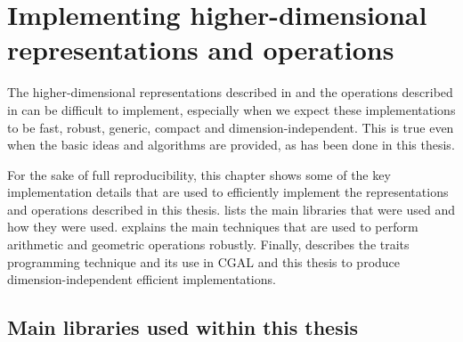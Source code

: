
\chapter{Implementing higher-dimensional representations and operations}
\label{ch:implementation}

The higher-dimensional representations described in  and the operations described in  can be difficult to implement, especially when we expect these implementations to be fast, robust, generic, compact and dimension-independent.
This is true even when the basic ideas and algorithms are provided, as has been done in this thesis.

For the sake of full reproducibility, this chapter shows some of the key implementation details that are used to efficiently implement the representations and operations described in this thesis.
 lists the main libraries that were used and how they were used.
 explains the main techniques that are used to perform arithmetic and geometric operations robustly.
Finally,  describes the traits programming technique and its use in CGAL and this thesis to produce dimension-independent efficient implementations.

\section{Main libraries used within this thesis}
\label{se:libraries}

